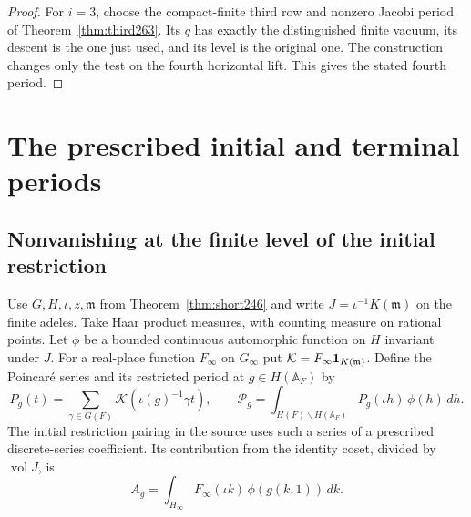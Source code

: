 \documentclass[a4paper,11pt]{article}
\theoremstyle{definition}
\theoremstyle{remark}
\numberwithin{equation}{section}
\begin{document}
\begin{proof}
For \(i=3\), choose the compact-finite third row and nonzero
Jacobi period of Theorem~\ref{thm:third263}. Its \(q\) has exactly
the distinguished finite vacuum, its descent is the one just
used, and its level is the original one. The construction
changes only the test on the fourth horizontal lift. This gives
the stated fourth period.
\end{proof}

\section{The prescribed initial and terminal periods}\label{nav:g-VII-3}

\subsection{Nonvanishing at the finite level of the initial restriction}\label{nav:I-52}
Use \(G,H,\iota,z,\mathfrak m\) from Theorem~\ref{thm:short246}
and write \(J=\iota^{-1}K(\mathfrak m)\) on the finite adeles.
Take Haar product measures, with counting measure on rational
points. Let \(\phi\) be a bounded continuous automorphic function
on \(H\) invariant under \(J\). For a real-place function \(F_\infty\)
on \(G_\infty\) put \(\mathcal K=F_\infty{\bf1}_{K(\mathfrak m)}\). Define
the Poincar\'e series and its restricted period at \(g\in H(\mathbb A_F)\) by
\[
 P_g(t)=\sum_{\gamma\in G(F)}\mathcal K(\iota(g)^{-1}\gamma t),
 \qquad
 \mathcal P_g=\int_{H(F)\backslash H(\mathbb A_F)}
                      P_g(\iota h)\,\phi(h)\,dh .
\]
The initial restriction pairing in the source uses such a series
of a prescribed discrete-series coefficient. Its contribution from
the identity coset, divided by \(\operatorname{vol}J\), is
\[
        A_g=\int_{H_\infty}F_\infty(\iota k)\,\phi(g(k,1))\,dk .
\]
\end{document}
